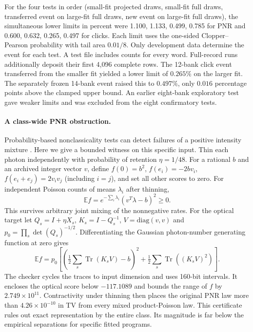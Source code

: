 \documentclass[11pt]{article}
\newcommand{\tr}{\operatorname{Tr}}
\newcommand{\E}{\mathbb{E}}
\begin{document}
For the four tests in order (small-fit projected draws, small-fit full draws, transferred event on large-fit full draws, new event on large-fit full draws), the simultaneous lower limits in percent were 1.100, 1.133, 0.499, 0.785 for PNR and 0.600, 0.632, 0.265, 0.497 for clicks. Each limit uses the one-sided Clopper--Pearson probability with tail area $0.01/8$. Only development data determine the event for each test. A test file includes counts for every word. Full-record runs additionally deposit their first 4,096 complete rows. The 12-bank click event transferred from the smaller fit yielded a lower limit of $0.265\%$ on the larger fit. The separately frozen 14-bank event raised this to $0.497\%$, only $0.016$ percentage points above the clamped upper bound. An earlier eight-bank exploratory test gave weaker limits and was excluded from the eight confirmatory tests.

\paragraph{A class-wide PNR obstruction.}
Probability-based nonclassicality tests can detect failures of a positive intensity mixture \cite{perina}. Here we give a bounded witness on this specific input. Thin each photon independently with probability of retention $\eta=1/48$. For a rational $b$ and an archived integer vector $v$, define $f(0)=b^2$, $f(e_i)=-2bv_i$, $f(e_i+e_j)=2v_i v_j$ (including $i=j$), and set all other scores to zero. For independent Poisson counts of means $\lambda_i$ after thinning,
\[
 \E f=e^{-\sum_i\lambda_i}(v^T\lambda-b)^2\ge0.
\]
This survives arbitrary joint mixing of the nonnegative rates. For the optical target let $Q_s=I+\eta X_s$, $K_s=I-Q_s^{-1}$, $V=\mathrm{diag}(v,v)$ and $p_0=\prod_s\det(Q_s)^{-1/2}$. Differentiating the Gaussian photon-number generating function at zero gives
\[
 \E f=p_0\left[\left(\tfrac12\sum_s\tr(K_s V)-b\right)^2+
              \tfrac12\sum_s\tr((K_s V)^2)\right].
\]
The checker cycles the traces to input dimension and uses 160-bit intervals. It encloses the optical score below $-117.1089$ and bounds the range of $f$ by $2.749\times10^{11}$. Contractivity under thinning then places the original PNR law more than $4.26\times10^{-10}$ in TV from every mixed product-Poisson law. This certificate rules out exact representation by the entire class. Its magnitude is far below the empirical separations for specific fitted programs.
\end{document}
